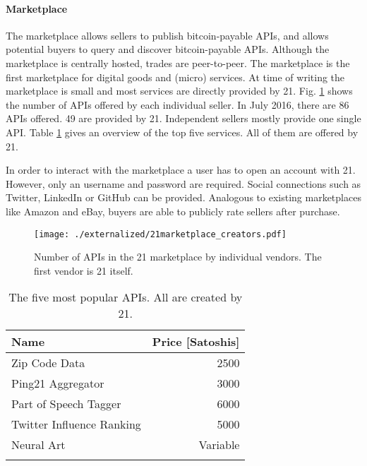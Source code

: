 \paragraph{Marketplace}

The marketplace allows sellers to publish bitcoin-payable APIs, and allows potential buyers to query and discover bitcoin-payable APIs. Although the marketplace is centrally hosted, trades are peer-to-peer. The marketplace is the first marketplace for digital goods and (micro) services. At time of writing the marketplace is small and most services are directly provided by 21. Fig. \ref{fig:21marketplace} shows the number of APIs offered by each individual seller. In July 2016, there are 86 APIs offered. 49 are provided by 21. Independent sellers mostly provide one single API. Table \ref{tbl:21marketplace} gives an overview of the top five services. All of them are offered by 21. 

In order to interact with the marketplace a user has to open an account with 21. However, only an username and password are required. Social connections such as Twitter, LinkedIn or GitHub can be provided. Analogous to existing marketplaces like Amazon and eBay, buyers are able to publicly rate sellers after purchase.  

\begin{figure}
\centering
\texttt{[image: ./externalized/21marketplace\_creators.pdf]}
\caption{Number of APIs in the 21 marketplace by individual vendors. The first vendor is 21 itself.}
\label{fig:21marketplace}
\end{figure}


\begin{table}
\centering
\begin{tabular}{lr}
    \toprule
    Name & Price [Satoshis] \\
    \midrule
    Zip Code Data & 2500 \\
    Ping21 Aggregator & 3000 \\
    Part of Speech Tagger & 6000 \\
    Twitter Influence Ranking & 5000 \\
    Neural Art & Variable \\
    \bottomrule
    \label{tbl:21marketplace}
  \end{tabular}
  \caption{The five most popular APIs. All are created by 21.}
  \end{table}
 


